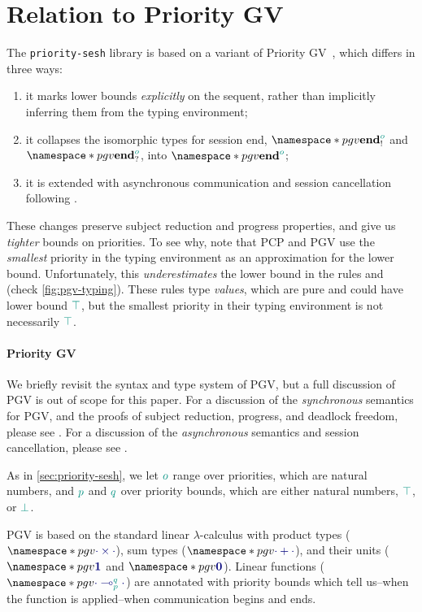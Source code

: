 \documentclass[sigplan,screen]{acmart}
\begin{document}
\section{Relation to Priority GV}
\label{sec:pgv}
The \texttt{priority-sesh} library is based on a variant of Priority GV~\cite{kokkedardha21}, which differs in three ways:
\begin{enumerate}
\item
  it marks lower bounds \emph{explicitly} on the sequent, rather than implicitly inferring them from the typing environment;
\item
  it collapses the isomorphic types for session end, $\pgv{\tyends[o]}$ and $\pgv{\tyendr[o]}$, into $\pgv{\tyend[o]}$;
\item
  it is extended with asynchronous communication and session cancellation following \citet{fowlerlindley19}.
\end{enumerate}
These changes preserve subject reduction and progress properties, and give us \emph{tighter} bounds on priorities. To see why, note that PCP \cite{dardhagay18} and PGV \cite{kokkedardha21} use the \emph{smallest} priority in the typing environment as an approximation for the lower bound. Unfortunately, this \emph{underestimates} the lower bound in the rules  and  (check \cref{fig:pgv-typing}). These rules type \emph{values}, which are pure and could have lower bound \ensuremath{\cs{\top}}, but the smallest priority in their typing environment is not necessarily \ensuremath{\cs{\top}}.

\paragraph{Priority GV}
We briefly revisit the syntax and type system of PGV, but a full discussion of PGV is out of scope for this paper. For a discussion of the \emph{synchronous} semantics for PGV, and the proofs of subject reduction, progress, and deadlock freedom, please see \citet{kokkedardha21}. For a discussion of the \emph{asynchronous} semantics and session cancellation, please see \citet{fowlerlindley19}.

As in \cref{sec:priority-sesh}, we let $\cs{o}$ range over priorities, which are natural numbers, and $\cs{p}$ and $\cs{q}$ over priority bounds, which are either natural numbers, $\cs{\top}$, or $\cs{\bot}$.

PGV is based on the standard linear $\lambda$-calculus with product types ($\pgv{\ty{\typrod{\cdot}{\cdot}}}$), sum types ($\pgv{\ty{\tysum{\cdot}{\cdot}}}$), and their units ($\pgv{\ty{\tyunit}}$ and $\pgv{\ty{\tyvoid}}$). Linear functions ($\pgv{\ty{\tylolli{p}{q}{\cdot}{\cdot}}}$) are annotated with priority bounds which tell us--when the function is applied--when communication begins and ends.
\end{document}
